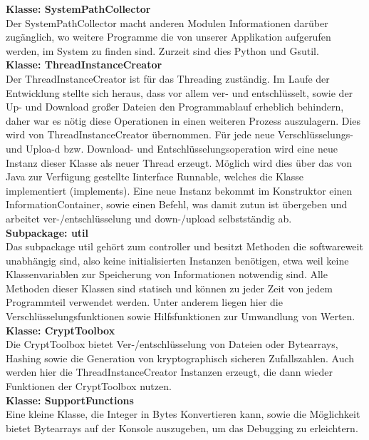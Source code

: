 \documentclass[12pt,a4paper,bibliography=totocnumbered,listof=totocnumbered]{scrartcl}
\begin{document}
\textbf{Klasse: SystemPathCollector}\\
Der SystemPathCollector macht anderen Modulen Informationen darüber zugänglich, wo weitere Programme die von unserer Applikation aufgerufen werden, im System zu finden sind. Zurzeit sind dies Python und Gsutil.\\
\textbf{Klasse: ThreadInstanceCreator}\\
Der ThreadInstanceCreator ist für das Threading zuständig. Im Laufe der Entwicklung stellte sich heraus, dass vor allem ver- und entschlüsselt, sowie der Up- und Download großer Dateien den Programmablauf erheblich behindern, daher war es nötig diese Operationen in einen weiteren Prozess auszulagern. Dies wird von ThreadInstanceCreator übernommen. Für jede neue Verschlüsselungs- und Uploa-d bzw. Download- und Entschlüsselungsoperation wird eine neue Instanz dieser Klasse als neuer Thread erzeugt. Möglich wird dies über das von Java zur Verfügung gestellte Iinterface Runnable, welches die Klasse implementiert (implements).  Eine neue Instanz bekommt im Konstruktor einen InformationContainer, sowie einen Befehl, was damit zutun ist übergeben und arbeitet ver-/entschlüsselung und down-/upload selbstständig ab.\\
\textbf{Subpackage: util}\\
Das subpackage util gehört zum controller und besitzt Methoden die softwareweit unabhängig sind, also keine initialisierten Instanzen benötigen, etwa weil keine Klassenvariablen zur Speicherung von Informationen notwendig sind. Alle Methoden dieser Klassen sind statisch und können zu jeder Zeit von jedem Programmteil verwendet werden. Unter anderem liegen hier die Verschlüsselungsfunktionen sowie Hilfsfunktionen zur Umwandlung von Werten. \\
\textbf{Klasse: CryptToolbox}\\
Die CryptToolbox bietet Ver-/entschlüsselung von Dateien oder Bytearrays, Hashing sowie die Generation von kryptographisch sicheren Zufallszahlen. Auch werden hier die ThreadInstanceCreator Instanzen erzeugt, die dann wieder Funktionen der CryptToolbox nutzen.\\
\textbf{Klasse: SupportFunctions}\\
Eine kleine Klasse, die Integer in Bytes Konvertieren kann, sowie die Möglichkeit bietet Bytearrays auf der Konsole auszugeben, um das Debugging zu erleichtern.\\
\end{document}
